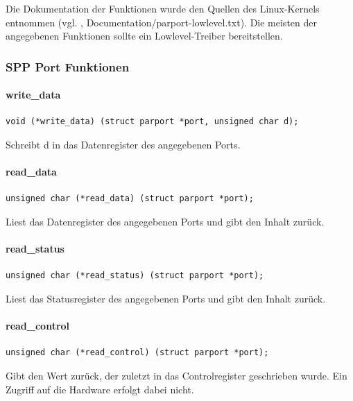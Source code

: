\documentclass[a4paper,11pt]{article}
\begin{document}
Die Dokumentation der Funktionen wurde den Quellen des Linux-Kernels entnommen 
(vgl. \cite{net:2}, Documentation/parport-lowlevel.txt). Die meisten der angegebenen Funktionen
sollte ein Lowlevel-Treiber bereitstellen.

\subsubsection{SPP Port Funktionen}

\paragraph{write\_data}

\begin{verbatim}
void (*write_data) (struct parport *port, unsigned char d);
\end{verbatim}

Schreibt d in das Datenregister des angegebenen Ports.

\paragraph{read\_data}

\begin{verbatim}
unsigned char (*read_data) (struct parport *port);
\end{verbatim}

Liest das Datenregister des angegebenen Ports und gibt den Inhalt zurück.

\paragraph{read\_status}

\begin{verbatim}
unsigned char (*read_status) (struct parport *port);
\end{verbatim}

Liest das Statusregister des angegebenen Ports und gibt den Inhalt zurück.

\paragraph{read\_control}

\begin{verbatim}
unsigned char (*read_control) (struct parport *port);
\end{verbatim}

Gibt den Wert zurück, der zuletzt in das Controlregister geschrieben wurde. Ein Zugriff
auf die Hardware erfolgt dabei nicht.
\end{document}
